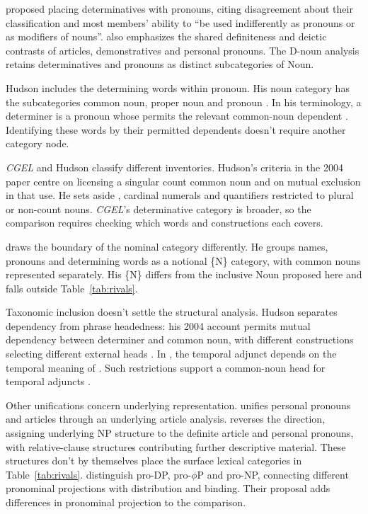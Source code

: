 \documentclass[12pt]{article}
\begin{document}
\textcite[24]{palmer1924} proposed placing determinatives with pronouns, citing disagreement about their classification and most members' ability to \enquote{be used indifferently as pronouns or as modifiers of nouns}. \textcite[279]{lyons1968} also emphasizes the shared definiteness and deictic contrasts of articles, demonstratives and personal pronouns. The D-noun analysis retains determinatives and pronouns as distinct subcategories of Noun.

Hudson includes the determining words within pronoun. His noun category has the subcategories common noun, proper noun and pronoun \citep[253--254]{hudson2010wordgrammar}. In his terminology, a determiner is a pronoun whose  permits the relevant common-noun dependent \citep[9--10]{hudson2004determiners}. Identifying these words by their permitted dependents doesn't require another category node.

\textit{CGEL} and Hudson classify different inventories. Hudson's criteria in the 2004 paper centre on licensing a singular count common noun and on mutual exclusion in that use. He sets aside , cardinal numerals and quantifiers restricted to plural or non-count nouns. \textit{CGEL}'s determinative category is broader, so the comparison requires checking which words and constructions each covers.

\textcite{anderson1997notional} draws the boundary of the nominal category differently. He groups names, pronouns and determining words as a notional \{N\} category, with common nouns represented separately. His \{N\} differs from the inclusive Noun proposed here and falls outside Table~\ref{tab:rivals}.

Taxonomic inclusion doesn't settle the structural analysis. Hudson separates dependency from phrase headedness: his 2004 account permits mutual dependency between determiner and common noun, with different constructions selecting different external heads \citep[7--9]{hudson2004determiners}. In , the temporal adjunct depends on the temporal meaning of . Such restrictions support a common-noun head for temporal adjuncts \citep[10--12]{hudson2004determiners}.

Other unifications concern underlying representation. \textcite{postal1966} unifies personal pronouns and articles through an underlying article analysis. \textcite[197--203]{sommerstein1972} reverses the direction, assigning underlying NP structure to the definite article and personal pronouns, with relative-clause structures contributing further descriptive material. These structures don't by themselves place the surface lexical categories in Table~\ref{tab:rivals}. \textcite{dechainewiltschko2002} distinguish pro-DP, pro-$\phi$P and pro-NP, connecting different pronominal projections with distribution and binding. Their proposal adds differences in pronominal projection to the comparison.
\end{document}
